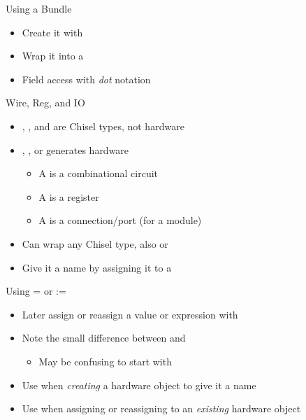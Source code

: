 \begin{frame}[fragile]{Using a Bundle}
\begin{itemize}
\item Create it with 
\item Wrap it into a 
\item Field access with \emph{dot} notation
\end{itemize}
\end{frame}

\begin{frame}[fragile]{Wire, Reg, and IO}
\begin{itemize}
\item {}, , and  are Chisel types, not hardware
\item {}, , or  generates hardware
\begin{itemize}
\item A  is a combinational circuit
\item A  is a register
\item A  is a connection/port (for a module)
\end{itemize}
\item Can wrap any Chisel type, also  or 
\item Give it a name by assigning it to a 
\end{itemize}
\end{frame}

\begin{frame}[fragile]{Using = or :=}
\begin{itemize}
\item Later assign or reassign a value or expression with \code{:=}
\end{itemize}
\begin{itemize}
\item Note the small difference between \code{=} and \code{:=}
\begin{itemize}
\item May be confusing to start with
\end{itemize}
\item Use \code{=} when \emph{creating} a hardware object to give it a name
\item Use \code{:=} when assigning or reassigning to an \emph{existing} hardware object
\end{itemize}
\end{frame}

